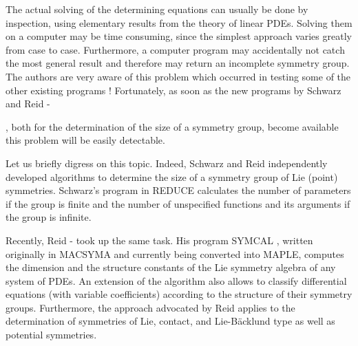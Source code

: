 \nopagebreak
The actual solving of the determining equations can usually be done
by inspection, using elementary results from the theory of linear PDEs.
Solving them on a computer may be time consuming, since the simplest 
approach varies greatly from case to case. Furthermore, a computer
program may accidentally not catch the most general result 
and therefore may return an incomplete symmetry group. 
The authors are very aware of this problem which occurred in testing
some of the other existing programs ! 
Fortunately, as soon as the new programs by Schwarz \cite{schwarzsizeprogram} 
and Reid \cite{reidprogram1}-{\cite{reidprogram3}, both for the 
determination of the size of a symmetry group, become available this problem
will be easily detectable.

\nopagebreak
Let us briefly digress on this topic.
Indeed, Schwarz and Reid independently developed
algorithms to determine the size of a symmetry group of Lie (point) symmetries.
Schwarz's program in REDUCE \cite{schwarzsizeprogram} calculates the number of 
parameters if the group is finite and the number of unspecified functions 
and its arguments if the group is infinite. 

\pagebreak
Recently, Reid \cite{reidprogram1}-\cite{reidprogram3} took up 
the same task. His program SYMCAL \cite{reidprogram2},
written originally in MACSYMA and currently being converted into MAPLE, 
computes the dimension and the structure constants of the Lie 
symmetry algebra of any system of PDEs.
An extension of the algorithm \cite{reidprogram3} also allows to classify
differential equations (with variable coefficients) according to the
structure of their symmetry groups. Furthermore, the approach 
advocated by Reid applies to the determination of symmetries of Lie, contact, 
and Lie-B\"acklund type as well as potential symmetries.

}
